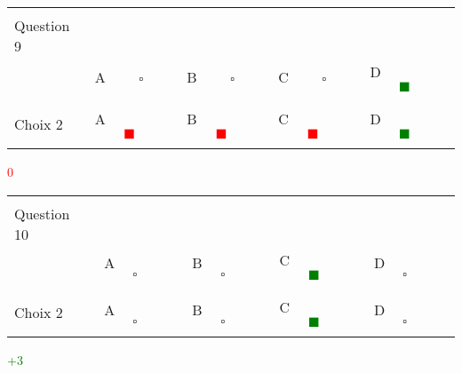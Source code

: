 \documentclass{book}%
\begin{document}
\thispagestyle{empty}%
\begin{center}%
\begin{tabular}{| l  l  l  l  l |}%
\hline%
 & & & & \\%
Question 9\qquad \qquad\ & & & & \\%
& A $\qquad \square \qquad$& B $\qquad \square \qquad$& C $\qquad \square \qquad$& D \textcolor{green}{$\qquad \blacksquare \qquad$}\\%
 & & & & \\%
\hline%
 & & & &  \\%
Choix 2& A \textcolor{red}{$\qquad \blacksquare \qquad$}& B \textcolor{red}{$\qquad \blacksquare \qquad$}& C \textcolor{red}{$\qquad \blacksquare \qquad$}& D \textcolor{green}{$\qquad \blacksquare \qquad$}\\%
 & & & &  \\%
\hline%
\end{tabular}%
 \qquad  \textcolor{red}{0}%
\\ \vskip3mm%
\end{center}%
\thispagestyle{empty}%
\begin{center}%
\begin{tabular}{| l  l  l  l  l |}%
\hline%
 & & & & \\%
Question 10\qquad \qquad\ & & & & \\%
& A $\qquad \square \qquad$& B $\qquad \square \qquad$& C \textcolor{green}{$\qquad \blacksquare \qquad$}& D $\qquad \square \qquad$\\%
 & & & & \\%
\hline%
 & & & &  \\%
Choix 2& A $\qquad \square \qquad$& B $\qquad \square \qquad$& C \textcolor{green}{$\qquad \blacksquare \qquad$}& D $\qquad \square \qquad$\\%
 & & & &  \\%
\hline%
\end{tabular}%
 \qquad  \textcolor{green}{+3}%
\\ \vskip3mm%
\end{center}%
\end{document}
